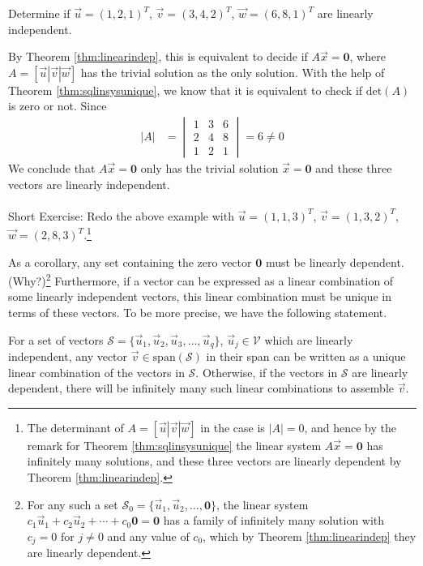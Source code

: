 \begin{exmp}
\label{exmp:exmplinearindep}
Determine if $\vec{u} = (1,2,1)^T$, $\vec{v} = (3,4,2)^T$, $\vec{w} = (6,8,1)^T$ are linearly independent.
\end{exmp}
By Theorem \ref{thm:linearindep}, this is equivalent to decide if $A\vec{x} = \textbf{0}$, where $A = [\vec{u}|\vec{v}|\vec{w}]$ has the trivial solution as the only solution. With the help of Theorem \ref{thm:sqlinsysunique}, we know that it is equivalent to check if $\text{det}(A)$ is zero or not. Since
\begin{align*}
|A| &=
\begin{vmatrix}
1 & 3 & 6\\
2 & 4 & 8 \\
1 & 2 & 1
\end{vmatrix} = 6 \neq 0
\end{align*}
We conclude that $A\vec{x} = \textbf{0}$ only has the trivial solution $\vec{x} = \textbf{0}$ and these three vectors are linearly independent. \\
\\
Short Exercise: Redo the above example with $\vec{u} = (1,1,3)^T$, $\vec{v} = (1,3,2)^T$, $\vec{w} = (2,8,3)^T$.\footnote{The determinant of $A = [\vec{u}|\vec{v}|\vec{w}]$ in the case is $|A| = 0$, and hence by the remark for Theorem \ref{thm:sqlinsysunique} the linear system $A\vec{x} = \textbf{0}$ has infinitely many solutions, and these three vectors are linearly dependent by Theorem \ref{thm:linearindep}.}\par
As a corollary, any set containing the zero vector $\textbf{0}$ must be linearly dependent. (Why?)\footnote{For any such a set $\mathcal{S}_0 = \{\vec{u}_1, \vec{u}_2, \ldots, \textbf{0}\}$, the linear system $c_1\vec{u}_1 + c_2\vec{u}_2 + \cdots + c_0\textbf{0} = \textbf{0}$ has a family of infinitely many solution with $c_j = 0$ for $j \neq 0$ and any value of $c_0$, which by Theorem \ref{thm:linearindep} they are linearly dependent.} Furthermore, if a vector can be expressed as a linear combination of some linearly independent vectors, this linear combination must be unique in terms of these vectors. To be more precise, we have the following statement.
\begin{proper}
\label{proper:lincombofspan}
For a set of vectors $\mathcal{S} = \{\vec{u}_1, \vec{u}_2, \vec{u}_3, \ldots, \vec{u}_q\}$, $\vec{u}_j \in \mathcal{V}$ which are linearly independent, any vector $\vec{v} \in \text{span}(\mathcal{S})$ in their span can be written as a unique linear combination of the vectors in $\mathcal{S}$. Otherwise, if the vectors in $\mathcal{S}$ are linearly dependent, there will be infinitely many such linear combinations to assemble $\vec{v}$.
\end{proper}
